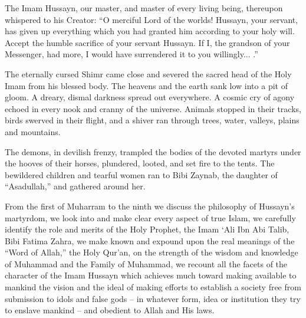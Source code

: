 The Imam Hussayn, our master, and master of every living being, thereupon whispered to his Creator: ``O merciful Lord of the worlds! Hussayn, your servant, has given up everything which you had granted him according to your holy will. Accept the humble sacrifice of your servant Hussayn. If I, the grandson of your Messenger, had more, I would have surrendered it to you willingly... .''

The eternally cursed Shimr came close and severed the sacred head of the Holy Imam from his blessed body. The heavens and the earth sank low into a pit of gloom. A dreary, dismal darkness spread out everywhere. A cosmic cry of agony echoed in every nook and cranny of the universe. Animals stopped in their tracks, birds swerved in their flight, and a shiver ran through trees, water, valleys, plains and mountains.

The demons, in devilish frenzy, trampled the bodies of the devoted martyrs under the hooves of their horses, plundered, looted, and set fire to the tents. The bewildered children and tearful women ran to Bibi Zaynab, the daughter of ``Asadullah,'' and gathered around her.

From the first of Muharram to the ninth we discuss the philosophy of Hussayn's martyrdom, we look into and make clear every aspect of true Islam, we carefully identify the role and merits of the Holy Prophet, the Imam `Ali Ibn Abi Talib, Bibi Fatima Zahra, we make known and expound upon the real meanings of the ``Word of Allah,'' the Holy Qur'an, on the strength of the wisdom and knowledge of Muhammad and the Family of Muhammad, we recount all the facets of the character of the Imam Hussayn which achieves much toward making available to mankind the vision and the ideal of making efforts to establish a society free from submission to idols and false gods -- in whatever form, idea or institution they try to enslave mankind -- and obedient to Allah and His laws.

